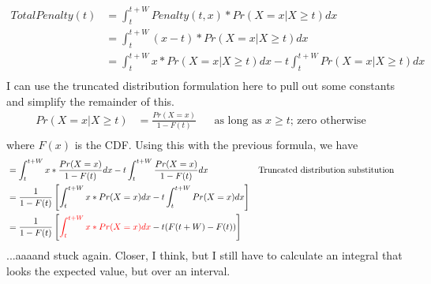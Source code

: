\documentclass{article}
\begin{document}
\begin{align*}
TotalPenalty(t) & = \int_t^{t+W}{Penalty(t, x) * Pr(X = x | X \ge t) dx} &&  & \\
& = \int_t^{t+W}{(x - t) * Pr(X = x | X \ge t) dx} &&  & \\
& = \int_t^{t+W}{x * Pr(X = x | X \ge t) dx} - t \int_t^{t+W}{Pr(X = x | X \ge t) dx} &&  & \\
\end{align*}
I can use the truncated distribution formulation here to pull out some constants and 
simplify the remainder of this.
\begin{align*}
Pr(X = x | X \ge t) & = \frac{Pr(X = x)}{1 - F(t)} && \mbox{as long as $x \ge t$; zero otherwise} & \\
\end{align*}
where $F(x)$ is the CDF.  Using this with the previous formula, we have
\begin{align*}
& = \int_t^{t+W}{x * \frac{Pr(X = x)}{1 - F(t)} dx} -
  t \int_t^{t+W}{\frac{Pr(X = x)}{1 - F(t)} dx} && \mbox{Truncated distribution substitution} & \\
& = \frac{1}{1 - F(t)}\left[\int_t^{t+W}{x * Pr(X = x) dx} -
  t \int_t^{t+W}{Pr(X = x) dx}\right] &&  & \\
& = \frac{1}{1 - F(t)}\left[\textcolor{red}{\int_t^{t+W}{x * Pr(X = x) dx}} -
  t (F(t+W) - F(t))\right] &&  & \\
\end{align*}
...aaaand stuck again. Closer, I think, but I still have to
calculate an integral that looks the expected value, but over an interval.

\begin{comment}
Actually, what about this...
\begin{align*}
  \int_t^{t+W}{x * Pr(X = x) dx}
  & = \int_t^{\infty}{x * Pr(X = x) dx} - \int_{t+W}^{\infty}{x * Pr(X = x) dx}
  & =
\end{align*}
\end{comment}
\end{document}
